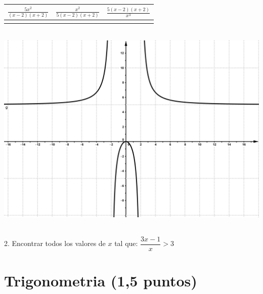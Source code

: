 \documentclass[a4paper,11pt,spanish,sans]{exam}
\newcommand{\Ts}{\rule{0pt}{2.8ex}}       %
\newcommand{\Bs}{\rule[-1.5ex]{0pt}{0pt}} %
\begin{document}
\begin{minipage}{.5\textwidth}
	\centering
	\begin{tabular}{|c|c|c|}
		\hline
		$\frac{5x^2}{(x-2)(x+2)}$  & $\frac{x^2}{5(x-2)(x+2)}$ & $\frac{5(x-2)(x+2)}{x^3}$ \Ts \Bs   \\ \hline
		&   &      \\ \hline
	\end{tabular}\\
	\centering
	\includegraphics[width= 0.95\linewidth]{integradora2.png}
\end{minipage}\\


2. Encontrar todos los valores de $x$ tal que: $\dfrac{3x-1}{x}>3$
\\

\section{Trigonometria (1,5 puntos)}
\end{document}
